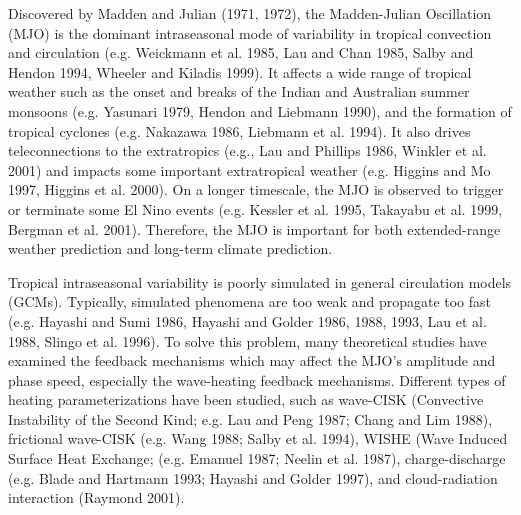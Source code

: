 \documentclass[12pt]{article}
\begin{document}
\newpage


  Discovered by Madden and Julian (1971, 1972), the Madden-Julian
Oscillation (MJO) is the dominant intraseasonal mode of variability in
tropical convection and circulation (e.g. Weickmann et al. 1985, Lau
and Chan 1985, Salby and Hendon 1994, Wheeler and Kiladis 1999). It
affects a wide range of tropical weather such as the onset and breaks
of the Indian and Australian summer monsoons (e.g. Yasunari 1979,
Hendon and Liebmann 1990), and the formation of tropical cyclones
(e.g. Nakazawa 1986, Liebmann et al. 1994).  It also drives
teleconnections to the extratropics (e.g., Lau and Phillips 1986,
Winkler et al. 2001) and impacts some important extratropical weather
(e.g. Higgins and Mo 1997, Higgins et al. 2000). On a longer
timescale, the MJO is observed to trigger or terminate some El Nino
events (e.g. Kessler et al. 1995, Takayabu et al. 1999, Bergman et
al. 2001).  Therefore, the MJO is important for both extended-range
weather prediction and long-term climate prediction.

Tropical intraseasonal variability is poorly simulated in general
circulation models (GCMs).  Typically, simulated phenomena are too
weak and propagate too fast (e.g. Hayashi and Sumi 1986, Hayashi and
Golder 1986, 1988, 1993, Lau et al. 1988, Slingo et al. 1996). 
To solve this problem, 
many theoretical studies have examined the feedback mechanisms which may
affect the MJO's amplitude and phase speed, especially the wave-heating
feedback mechanisms.
Different types of heating parameterizations have been studied, such as
wave-CISK (Convective Instability of the Second Kind;
e.g. Lau and Peng 1987; Chang and Lim 1988),  
frictional wave-CISK (e.g. Wang 1988; Salby et al. 1994),
WISHE (Wave Induced Surface Heat Exchange; 
(e.g. Emanuel 1987; Neelin et al. 1987), 
charge-discharge (e.g. Blade and Hartmann 1993; 
Hayashi and Golder 1997), 
and cloud-radiation interaction (Raymond 2001).
\end{document}
